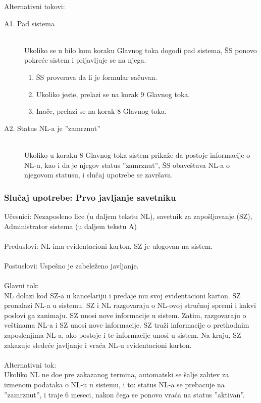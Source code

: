 \noindent Alternativni tokovi: 
\begin{description}
	\item[A1. Pad sistema] ~\\
	Ukoliko se u bilo kom koraku Glavnog toka dogodi pad sistema, \v SS ponovo pokre\'ce sistem i prijavljuje se na njega.
	\begin{enumerate}
		\item \v SS proverava da li je formular sa\v cuvan.
		\item Ukoliko jeste, prelazi se na korak 9 Glavnog toka.
		\item Ina\v ce, prelazi se na korak 8 Glavnog toka.
	\end{enumerate}

	\item[A2. Status NL-a je ''zamrznut''] ~\\
	Ukoliko u koraku 8 Glavnog toka sistem prika\v ze da postoje informacije o NL-u, kao i da je njegov status ''zamrznut'', \v SS obave\v stava NL-a o njegovom statusu, i slu\v caj upotrebe se zavr\v sava.
\end{description}

\subsubsection{Slu\v caj upotrebe: Prvo javljanje savetniku}
\label{su: prvo javljanje savetniku}

\noindent U\v cesnici: Nezaposleno lice (u daljem tekstu NL), savetnik za zapo\v sljavanje (SZ), Administrator sistema (u daljem tekstu A)
\\
\\ Preduslovi: NL ima evidentacioni karton. SZ je ulogovan na sistem. 
\\
\\ Postuslovi: Uspe\v sno je zabele\v zeno javljanje.
\\ 
\\ Glavni tok:
\\ NL dolazi kod SZ-a u kancelariju i predaje mu svoj evidentacioni karton. SZ pronalazi NL-a u sistemu. SZ i NL razgovaraju o NL-ovoj stru\v cnoj spremi i kakvi poslovi ga zanimaju. SZ unosi nove informacije u sistem. Zatim, razgovaraju o ve\v stinama NL-a i SZ unosi nove informacije. SZ tra\v zi informacije o prethodnim zaposlenjima NL-a, ako postoje i te informacije unosi u sistem. Na kraju, SZ zakazuje slede\' ce javljanje i vra\' ca NL-u evidentacioni karton.
\\
\\ Alternativni tok:
\\ Ukoliko NL ne do\dj e pre zakazanog termina, automatski se \v salje zahtev za izmenom podataka o NL-u u sistemu, i to: status NL-a se prebacuje na ''zamrznut'', i traje 6 meseci, nakon \v cega se ponovo vra\' ca na status ''aktivan''.
